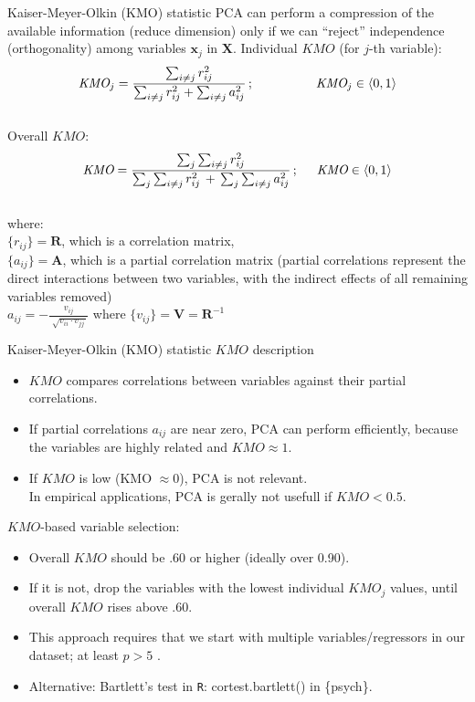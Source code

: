 \documentclass{beamer}
\begin{document}
\begin{frame}{Kaiser-Meyer-Olkin (KMO) statistic}
PCA can perform a compression of the available information (reduce dimension) only if we can ``reject''  independence (orthogonality) among variables $\bm{x}_j$ in $\bm{X}$.
\bigskip
Individual $\textit{KMO}$ (for $j$-th variable):
$$\textit{KMO}_j = \frac{\sum_{i\neq j} r_{ij}^2}{\sum_{i\neq j} r_{ij}^2 + \sum_{i\neq j} a_{ij}^2}\,;\hspace{1,7cm} \textit{KMO}_j \in \langle 0,1 \rangle $$\\
Overall $\textit{KMO}$:
$$\textit{KMO} = \frac{\sum_j \sum_{i\neq j} r_{ij}^2}
                   {\sum_j \sum_{i\neq j} r_{ij}^2 \,+\, \sum_j \sum_{i\neq j} a_{ij}^2}\,
                   ;\hspace{0.5cm} \textit{KMO} \in \langle 0,1 \rangle $$\\

where:\\
$\{r_{ij} \} = \bm{R}$, which is a correlation matrix,\\
$\{a_{ij} \} = \bm{A}$, which is a partial correlation matrix (partial correlations represent the direct interactions between two variables, with the indirect effects of all remaining variables removed)\\
$a_{ij} = - \frac{v_{ij}}{\sqrt[]{v_{ii} \cdot v_{jj}\,}}$ where $\{ v_{ij} \} = \bm{V} = \bm{R}^{-1}$
\end{frame}
\begin{frame}{Kaiser-Meyer-Olkin (KMO) statistic}
$\textit{KMO}$ description 
\begin{itemize}
\item $\textit{KMO}$ compares  correlations between variables against their partial correlations. 
\item If partial correlations $a_{ij}$ are near zero, PCA can perform efficiently, because the
variables are highly related and $\textit{KMO} \approx 1$.
\item If $\textit{KMO}$ is low (KMO $\approx 0$), PCA is not relevant.\\In empirical applications, PCA is gerally not usefull if $\textit{KMO} < 0.5$.
\end{itemize}
\bigskip
$\textit{KMO}$-based variable selection:
\smallskip
\begin{itemize}
\item Overall $\textit{KMO}$ should be .60 or higher (ideally over 0.90).
\item If it is not, drop the variables with the lowest individual $\textit{KMO}_j$ values, until overall $\textit{KMO}$ rises above .60.
\item This approach requires that we start with multiple variables/regressors in our dataset; at least $p > 5$ .
\item Alternative: Bartlett’s test in \texttt{R}: cortest.bartlett() in \{psych\}.
\end{itemize}
\end{frame}
\end{document}
